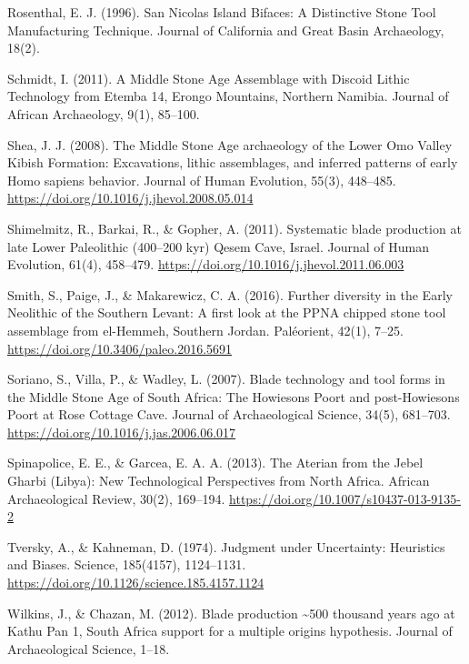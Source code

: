 \documentclass[
]{article}
\begin{document}
Rosenthal, E. J. (1996). San Nicolas Island Bifaces: A Distinctive Stone
Tool Manufacturing Technique. Journal of California and Great Basin
Archaeology, 18(2).

Schmidt, I. (2011). A Middle Stone Age Assemblage with Discoid Lithic
Technology from Etemba 14, Erongo Mountains, Northern Namibia. Journal
of African Archaeology, 9(1), 85--100.

Shea, J. J. (2008). The Middle Stone Age archaeology of the Lower Omo
Valley Kibish Formation: Excavations, lithic assemblages, and inferred
patterns of early Homo sapiens behavior. Journal of Human Evolution,
55(3), 448--485. \url{https://doi.org/10.1016/j.jhevol.2008.05.014}

Shimelmitz, R., Barkai, R., \& Gopher, A. (2011). Systematic blade
production at late Lower Paleolithic (400--200 kyr) Qesem Cave, Israel.
Journal of Human Evolution, 61(4), 458--479.
\url{https://doi.org/10.1016/j.jhevol.2011.06.003}

Smith, S., Paige, J., \& Makarewicz, C. A. (2016). Further diversity in
the Early Neolithic of the Southern Levant: A first look at the PPNA
chipped stone tool assemblage from el-Hemmeh, Southern Jordan.
Paléorient, 42(1), 7--25. \url{https://doi.org/10.3406/paleo.2016.5691}

Soriano, S., Villa, P., \& Wadley, L. (2007). Blade technology and tool
forms in the Middle Stone Age of South Africa: The Howiesons Poort and
post-Howiesons Poort at Rose Cottage Cave. Journal of Archaeological
Science, 34(5), 681--703.
\url{https://doi.org/10.1016/j.jas.2006.06.017}

Spinapolice, E. E., \& Garcea, E. A. A. (2013). The Aterian from the
Jebel Gharbi (Libya): New Technological Perspectives from North Africa.
African Archaeological Review, 30(2), 169--194.
\url{https://doi.org/10.1007/s10437-013-9135-2}

Tversky, A., \& Kahneman, D. (1974). Judgment under Uncertainty:
Heuristics and Biases. Science, 185(4157), 1124--1131.
\url{https://doi.org/10.1126/science.185.4157.1124}

Wilkins, J., \& Chazan, M. (2012). Blade production \textasciitilde500
thousand years ago at Kathu Pan 1, South Africa support for a multiple
origins hypothesis. Journal of Archaeological Science, 1--18.
\end{document}
